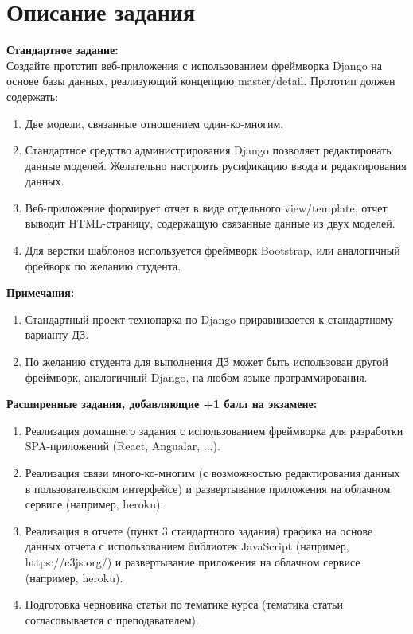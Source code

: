 \documentclass[20pt,a4paper]{report}
\begin{document}
	\chapter{Описание задания}
	\large
	\qquad \textbf{Стандартное задание:} \\
	\qquad Создайте прототип веб-приложения с использованием фреймворка Django на основе базы данных, реализующий концепцию master/detail. Прототип должен содержать: \\
		\begin{enumerate}
			\item Две модели, связанные отношением один-ко-многим.
			\item Стандартное средство администрирования Django позволяет редактировать данные моделей. Желательно настроить русификацию ввода и редактирования данных.
			\item Веб-приложение формирует отчет в виде отдельного view/template, отчет выводит HTML-страницу, содержащую связанные данные из двух моделей.
			\item Для верстки шаблонов используется фреймворк Bootstrap, или аналогичный фрейворк по желанию студента.
		\end{enumerate}
	\qquad \textbf{Примечания:} \\
		\begin{enumerate}
			\item Стандартный проект технопарка по Django приравнивается к стандартному варианту ДЗ.
			\item По желанию студента для выполнения ДЗ может быть использован другой фреймворк, аналогичный Django, на любом языке программирования.
		\end{enumerate}
	\qquad \textbf{Расширенные задания, добавляющие +1 балл на экзамене:}
		\begin{enumerate}
			\item Реализация домашнего задания с использованием фреймворка для разработки SPA-приложений (React, Angualar, ...).
			\item Реализация связи много-ко-многим (с возможностью редактирования данных в пользовательском интерфейсе) и развертывание приложения на облачном сервисе (например, heroku).
			\item Реализация в отчете (пункт 3 стандартного задания) графика на основе данных отчета с использованием библиотек JavaScript (например, https://c3js.org/) и развертывание приложения на облачном сервисе (например, heroku).
			\item Подготовка черновика статьи по тематике курса (тематика статьи согласовывается с преподавателем).
		\end{enumerate}
	
\end{document}
